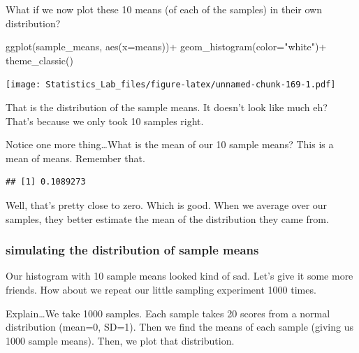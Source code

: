 \documentclass[
]{book}
\newenvironment{Shaded}{\begin{snugshade}}{\end{snugshade}}
\newcommand{\AttributeTok}[1]{\textcolor[rgb]{0.77,0.63,0.00}{#1}}
\newcommand{\FunctionTok}[1]{\textcolor[rgb]{0.00,0.00,0.00}{#1}}
\newcommand{\NormalTok}[1]{#1}
\newcommand{\SpecialCharTok}[1]{\textcolor[rgb]{0.00,0.00,0.00}{#1}}
\newcommand{\StringTok}[1]{\textcolor[rgb]{0.31,0.60,0.02}{#1}}
\begin{document}
What if we now plot these 10 means (of each of the samples) in their own distribution?

\begin{Shaded}
\begin{Highlighting}[]
 \FunctionTok{ggplot}\NormalTok{(sample\_means, }\FunctionTok{aes}\NormalTok{(}\AttributeTok{x=}\NormalTok{means))}\SpecialCharTok{+}
  \FunctionTok{geom\_histogram}\NormalTok{(}\AttributeTok{color=}\StringTok{"white"}\NormalTok{)}\SpecialCharTok{+}
  \FunctionTok{theme\_classic}\NormalTok{()}
\end{Highlighting}
\end{Shaded}

\texttt{[image: Statistics\_Lab\_files/figure-latex/unnamed-chunk-169-1.pdf]}

That is the distribution of the sample means. It doesn't look like much eh? That's because we only took 10 samples right.

Notice one more thing\ldots What is the mean of our 10 sample means? This is a mean of means. Remember that.

\begin{Shaded}
\end{Shaded}

\begin{verbatim}
## [1] 0.1089273
\end{verbatim}

Well, that's pretty close to zero. Which is good. When we average over our samples, they better estimate the mean of the distribution they came from.

\hypertarget{simulating-the-distribution-of-sample-means}{%
\subsubsection{simulating the distribution of sample means}\label{simulating-the-distribution-of-sample-means}}

Our histogram with 10 sample means looked kind of sad. Let's give it some more friends. How about we repeat our little sampling experiment 1000 times.

Explain\ldots We take 1000 samples. Each sample takes 20 scores from a normal distribution (mean=0, SD=1). Then we find the means of each sample (giving us 1000 sample means). Then, we plot that distribution.
\end{document}
